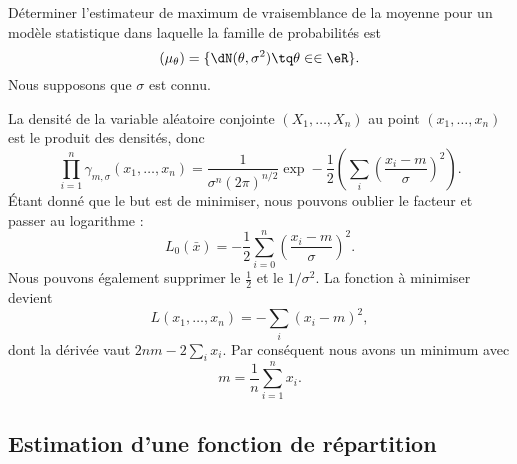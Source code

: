 \begin{example}
    
    Déterminer l'estimateur de maximum de vraisemblance de la moyenne pour un modèle statistique dans laquelle la famille de probabilités est
    \begin{equation}
        (\mu_{\theta})=\{ \dN(\theta,\sigma^2)\tq \theta\in\in\eR \}.
    \end{equation}
    Nous supposons que \( \sigma\) est connu.

    La densité de la variable aléatoire conjointe \( (X_1,\ldots,X_n)\) au point \( (x_1,\ldots,x_n)\) est le produit des densités, donc
    \begin{equation}
        \prod_{i=1}^n\gamma_{m,\sigma}(x_1,\ldots,x_n)=\frac{1}{ \sigma^n(2\pi)^{n/2} }\exp-\frac{ 1 }{2}\left( \sum_i\left( \frac{ x_i-m }{ \sigma } \right)^2 \right).
    \end{equation}
    Étant donné que le but est de minimiser, nous pouvons oublier le facteur et passer au logarithme :
    \begin{equation}
        L_0(\bar x)=-\frac{ 1 }{2}\sum_{i=0}^n\left( \frac{ x_i-m }{ \sigma } \right)^2.
    \end{equation}
    Nous pouvons également supprimer le \( \frac{ 1 }{2}\) et le \( 1/\sigma^2\). La fonction à minimiser devient
    \begin{equation}
        L(x_1,\ldots,x_n)=-\sum_i(x_i-m)^2,
    \end{equation}
    dont la dérivée vaut \( 2nm-2\sum_ix_i\). Par conséquent nous avons un minimum avec
    \begin{equation}
        m=\frac{1}{ n }\sum_{i=1}^nx_i.
    \end{equation}
\end{example}

\subsection{Estimation d'une fonction de répartition}


